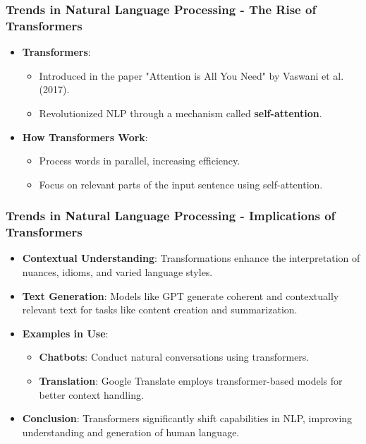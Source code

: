 \documentclass{beamer}
\begin{document}
\begin{frame}[fragile]
    \frametitle{Trends in Natural Language Processing - The Rise of Transformers}
    \begin{itemize}
        \item \textbf{Transformers}:
        \begin{itemize}
            \item Introduced in the paper "Attention is All You Need" by Vaswani et al. (2017).
            \item Revolutionized NLP through a mechanism called \textbf{self-attention}.
        \end{itemize}
        
        \item \textbf{How Transformers Work}:
        \begin{itemize}
            \item Process words in parallel, increasing efficiency.
            \item Focus on relevant parts of the input sentence using self-attention.
        \end{itemize}
    \end{itemize}
\end{frame}

\begin{frame}[fragile]
    \frametitle{Trends in Natural Language Processing - Implications of Transformers}
    \begin{itemize}
        \item \textbf{Contextual Understanding}: 
        Transformations enhance the interpretation of nuances, idioms, and varied language styles.
        
        \item \textbf{Text Generation}: 
        Models like GPT generate coherent and contextually relevant text for tasks like content creation and summarization.
        
        \item \textbf{Examples in Use}:
        \begin{itemize}
            \item \textbf{Chatbots}: Conduct natural conversations using transformers.
            \item \textbf{Translation}: Google Translate employs transformer-based models for better context handling.
        \end{itemize}
        
        \item \textbf{Conclusion}: 
        Transformers significantly shift capabilities in NLP, improving understanding and generation of human language.
    \end{itemize}
\end{frame}
\end{document}
